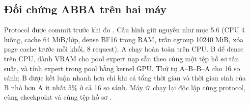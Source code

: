 \subsection{Đối chứng ABBA trên hai máy}

Protocol được commit trước khi đo \cite{exp_vram_pool_i5}. Cấu hình giữ nguyên như mục 5.6 (CPU 4 luồng, cache 64 MiB/lớp, dense BF16 trong RAM, trần cgroup 10240 MiB, xóa page cache trước mỗi khối, 8 request). A chạy hoàn toàn trên CPU. B để dense trên CPU, dành VRAM cho pool expert nạp sẵn theo cùng một tệp hồ sơ tần suất, và tính expert trong pool bằng kernel GPU. Thứ tự A--B--B--A cho 16 so sánh; B được kết luận nhanh hơn chỉ khi cả tổng thời gian và thời gian sinh của B nhỏ hơn A ít nhất 5\% ở cả 16 so sánh. Máy i7 chạy lại độc lập cùng protocol, cùng checkpoint và cùng tệp hồ sơ \cite{exp_vram_pool_i7}.

